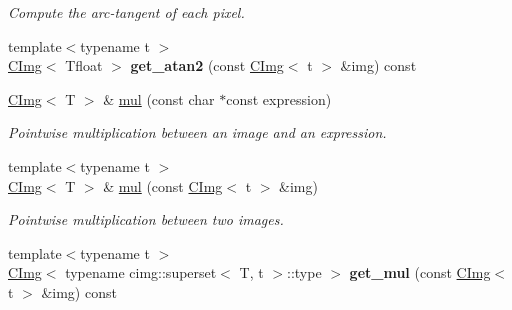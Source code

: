 \begin{DoxyCompactItemize}
\begin{DoxyCompactList}\small\item\em Compute the arc-\/tangent of each pixel. \item\end{DoxyCompactList}\item 
\hypertarget{structcimg__library_1_1CImg_a259e6634fe2539d26dbaca9314504977}{
{\footnotesize template$<$typename t $>$ }\\\hyperlink{structcimg__library_1_1CImg}{CImg}$<$ Tfloat $>$ {\bfseries get\_\-atan2} (const \hyperlink{structcimg__library_1_1CImg}{CImg}$<$ t $>$ \&img) const }
\label{structcimg__library_1_1CImg_a259e6634fe2539d26dbaca9314504977}

\item 
\hypertarget{structcimg__library_1_1CImg_a28292636e78480b41f3bf3af7423a0ac}{
\hyperlink{structcimg__library_1_1CImg}{CImg}$<$ T $>$ \& \hyperlink{structcimg__library_1_1CImg_a28292636e78480b41f3bf3af7423a0ac}{mul} (const char $\ast$const expression)}
\label{structcimg__library_1_1CImg_a28292636e78480b41f3bf3af7423a0ac}

\begin{DoxyCompactList}\small\item\em Pointwise multiplication between an image and an expression. \item\end{DoxyCompactList}\item 
\hypertarget{structcimg__library_1_1CImg_ac026a207188625e845af7abf60a31a7b}{
{\footnotesize template$<$typename t $>$ }\\\hyperlink{structcimg__library_1_1CImg}{CImg}$<$ T $>$ \& \hyperlink{structcimg__library_1_1CImg_ac026a207188625e845af7abf60a31a7b}{mul} (const \hyperlink{structcimg__library_1_1CImg}{CImg}$<$ t $>$ \&img)}
\label{structcimg__library_1_1CImg_ac026a207188625e845af7abf60a31a7b}

\begin{DoxyCompactList}\small\item\em Pointwise multiplication between two images. \item\end{DoxyCompactList}\item 
\hypertarget{structcimg__library_1_1CImg_a14a5e4c1b11851ded227c56585e0f4e3}{
{\footnotesize template$<$typename t $>$ }\\\hyperlink{structcimg__library_1_1CImg}{CImg}$<$ typename cimg::superset$<$ T, t $>$::type $>$ {\bfseries get\_\-mul} (const \hyperlink{structcimg__library_1_1CImg}{CImg}$<$ t $>$ \&img) const }
\label{structcimg__library_1_1CImg_a14a5e4c1b11851ded227c56585e0f4e3}


\end{DoxyCompactItemize}
